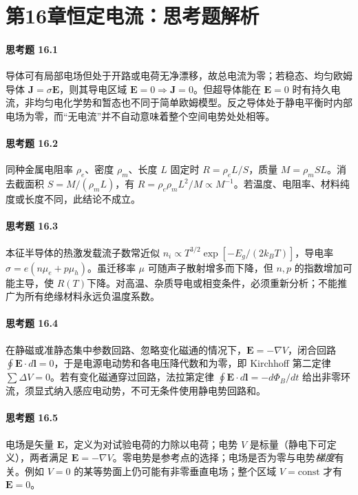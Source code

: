 \section*{第16章\quad 恒定电流：思考题解析}
\paragraph{思考题 16.1}
导体可有局部电场但处于开路或电荷无净漂移，故总电流为零；若稳态、均匀欧姆导体 \(\boldsymbol J=\sigma\boldsymbol E\)，则其导电区域 \(\boldsymbol E=0\Rightarrow\boldsymbol J=0\)。但超导体能在 \(\boldsymbol E=0\) 时有持久电流，非均匀电化学势和暂态也不同于简单欧姆模型。反之导体处于静电平衡时内部电场为零，而“无电流”并不自动意味着整个空间电势处处相等。

\paragraph{思考题 16.2}
同种金属电阻率 \(\rho_e\)、密度 \(\rho_m\)、长度 \(L\) 固定时 \(R=\rho_e L/S\)，质量 \(M=\rho_m SL\)。消去截面积 \(S=M/(\rho_m L)\)，有 \(\boxed{R=\rho_e\rho_m L^2/M\propto M^{-1}}\)。若温度、电阻率、材料纯度或长度不同，此结论不成立。

\paragraph{思考题 16.3}
本征半导体的热激发载流子数常近似 \(n_i\propto T^{3/2}\exp[-E_g/(2k_BT)]\)，导电率 \(\sigma=e(n\mu_e+p\mu_h)\)。虽迁移率 \(\mu\) 可随声子散射增多而下降，但 \(n,p\) 的指数增加可能主导，使 \(\boxed{R(T)\text{下降}}\)。对高温、杂质导电或相变条件，必须重新分析；不能推广为所有绝缘材料永远负温度系数。

\paragraph{思考题 16.4}
在静磁或准静态集中参数回路、忽略变化磁通的情况下，\(\boldsymbol E=-\nabla V\)，闭合回路 \(\oint\boldsymbol E\cdot d\boldsymbol l=0\)，于是电源电动势和各电压降代数和为零，即 Kirchhoff 第二定律 \(\sum \Delta V=0\)。若有变化磁通穿过回路，法拉第定律 \(\oint\boldsymbol E\cdot d\boldsymbol l=-d\Phi_B/dt\) 给出非零环流，须显式纳入感应电动势，不可无条件使用静电势回路和。

\paragraph{思考题 16.5}
电场是矢量 \(\boldsymbol E\)，定义为对试验电荷的力除以电荷；电势 \(V\) 是标量（静电下可定义），两者满足 \(\boxed{\boldsymbol E=-\nabla V}\)。零电势是参考点的选择；电场是否为零与电势\emph{梯度}有关。例如 \(V=0\) 的某等势面上仍可能有非零垂直电场；整个区域 \(V=\mathrm{const}\) 才有 \(\boldsymbol E=0\)。

